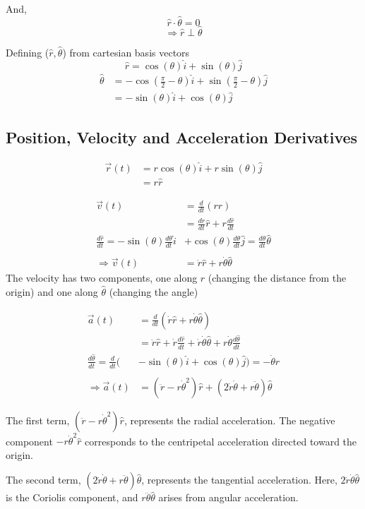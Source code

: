 \documentclass{article}
\begin{document}
And,
\[
\hat{r} \cdot \hat{\theta} = 0
\]
\[
\Rightarrow \hat{r} \perp \hat{\theta}
\]

Defining (\(\hat{r}, \hat{\theta}\)) from cartesian basis vectors
\[
\hat{r} = \cos(\theta) \hat{i} + \sin(\theta)\hat{j}
\]
\begin{align*}
    \hat{\theta} &= -\cos(\frac{\pi}{2}- \theta)\hat{i} + \sin(\frac{\pi}{2} -\theta)\hat{j} \\
    &= -\sin(\theta) \hat{i} + \cos(\theta) \hat{j}
\end{align*}

\newpage
\subsection*{Position, Velocity and Acceleration Derivatives}
\begin{align*}
    \vec{r}(t) &= r\cos(\theta)\hat{i} + r\sin(\theta)\hat{j} \\
    &= r\hat{r}
\end{align*}

\begin{align*}
    \vec{v}(t) &= \frac{d}{dt}(r\hat{r}) \\
    &= \frac{dr}{dt}\hat{r} + r \frac{d\hat{r}}{dt} \\
    \frac{d\hat{r}}{dt} = -\sin(\theta) \frac{d\theta}{dt} \hat{i} &+ \cos(\theta) \frac{d\theta}{dt} \hat{j} = \frac{d\theta}{dt}\hat{\theta} \\
    \\
    \Rightarrow \vec{v}(t)&= \dot{r}\hat{r} + r\dot{\theta}\hat{\theta}
\end{align*}
The velocity has two components, one along \(\hat{r}\) (changing the distance from the origin) and one along \(\hat{\theta}\) (changing the angle)

\begin{align*}
    \vec{a}(t) &= \frac{d}{dt} (\dot{r}\hat{r} + r\dot{\theta}\hat{\theta}) \\
    &= \ddot{r}\hat{r} + \dot{r}\frac{d\hat{r}}{dt} + \dot{r}\dot{\theta}\hat{\theta} + r\dot{\theta}\frac{d\hat{\theta}}{dt} \\
    \frac{d\hat{\theta}}{dt} = \frac{d}{dt}(&-\sin(\theta) \hat{i} + \cos(\theta) \hat{j}) = -\dot{\theta}\hat{r} \\
    \\
    \Rightarrow \vec{a}(t)&=(\ddot{r}-r\dot{\theta}^2)\hat{r} + (2\dot{r}\dot{\theta}+ r \ddot{\theta})\hat{\theta} 
\end{align*}

The first term, $(\ddot{r} - r\dot{\theta}^2)\hat{r}$, represents the
radial acceleration. The negative component $-r\dot{\theta}^2\hat{r}$ corresponds
to the centripetal acceleration directed toward the origin.

The second term, $(2\dot{r}\dot{\theta} + r\ddot{\theta})\hat{\theta}$, represents
the tangential acceleration. Here, $2\dot{r}\dot{\theta}\hat{\theta}$ is the Coriolis component,
and $r\ddot{\theta}\hat{\theta}$ arises from angular acceleration.
\end{document}
